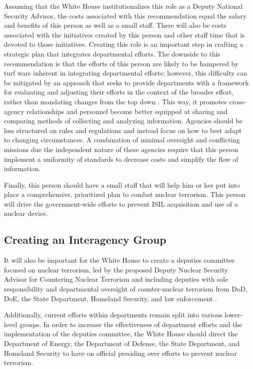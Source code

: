 \documentclass{report}
\begin{document}
Assuming that the White House institutionalizes this role as a Deputy National Security Advisor, the costs associated with this recommendation equal the salary and benefits of this person as well as a small staff. There will also be costs associated with the initiatives created by this person and other staff time that is devoted to those initiatives. Creating this role is an important step in crafting a strategic plan that integrates departmental efforts. The downside to this recommendation is that the efforts of this person are likely to be hampered by turf wars inherent in integrating departmental efforts; however, this difficulty can be mitigated by an approach that seeks to provide departments with a framework for evaluating and adjusting their efforts in the context of the broader effort, rather than mandating changes from the top down \cite{Levi2008}. This way, it promotes cross-agency relationships and personnel become better equipped at sharing and comparing methods of collecting and analyzing information.  Agencies should be less structured on rules and regulations and instead focus on how to best adapt to changing circumstances. A combination of minimal oversight and conflicting missions due the independent nature of these agencies \cite{Zegart2005} require that this person implement a uniformity of standards to decrease costs and simplify the flow of information. 


Finally, this person should have a small staff that will help him or her put into place a comprehensive, prioritized plan to combat nuclear terrorism. This person will drive the government-wide efforts to prevent ISIL acquisition and use of a nuclear device. 

\subsection{Creating an Interagency Group}

It will also be important for the White House to create a deputies committee focused on nuclear terrorism, led by the proposed Deputy Nuclear Security Advisor for Countering Nuclear Terrorism and including deputies with sole responsibility and departmental oversight of counter-nuclear terrorism from DoD, DoE, the State Department, Homeland Security, and law enforcement \cite{Bronner2008}.

Additionally, current efforts within departments remain split into various lower-level groups. In order to increase the effectiveness of department efforts and the implementation of the deputies committee, the White House should direct the Department of Energy, the Department of Defense, the State Department, and Homeland Security to have on official presiding over efforts to prevent nuclear terrorism. 
\end{document}
